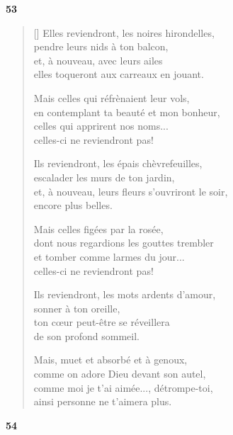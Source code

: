 \documentclass[a4paper,12pt]{book}
\begin{document}
\bigskip

\begin{center}
  \textbf{53}
\end{center}

\settowidth{\versewidth}{et, à nouveau, leurs fleurs s'ouvriront le soir,}

\begin{verse}[\versewidth]
  Elles reviendront, les noires hirondelles, \\
  pendre leurs nids à ton balcon, \\
  et, à nouveau, avec leurs ailes \\
  elles toqueront aux carreaux en jouant.

  Mais celles qui réfrènaient leur vols, \\
  en contemplant ta beauté et mon bonheur, \\
  celles qui apprirent nos noms... \\
  celles-ci ne reviendront pas!

  Ils reviendront, les épais chèvrefeuilles, \\
  escalader les murs de ton jardin, \\
  et, à nouveau, leurs fleurs s'ouvriront le soir, \\
  encore plus belles.

  Mais celles figées par la rosée, \\
  dont nous regardions les gouttes trembler \\
  et tomber comme larmes du jour... \\
  celles-ci ne reviendront pas!

  Ils reviendront, les mots ardents d'amour, \\
  sonner à ton oreille, \\
  ton cœur peut-être se réveillera \\
  de son profond sommeil.

  Mais, muet et absorbé et à genoux, \\
  comme on adore Dieu devant son autel, \\
  comme moi je t'ai aimée..., détrompe-toi, \\
  ainsi personne ne t'aimera plus.
\end{verse}

\bigskip

\begin{center}
  \textbf{54}
\end{center}
\end{document}
